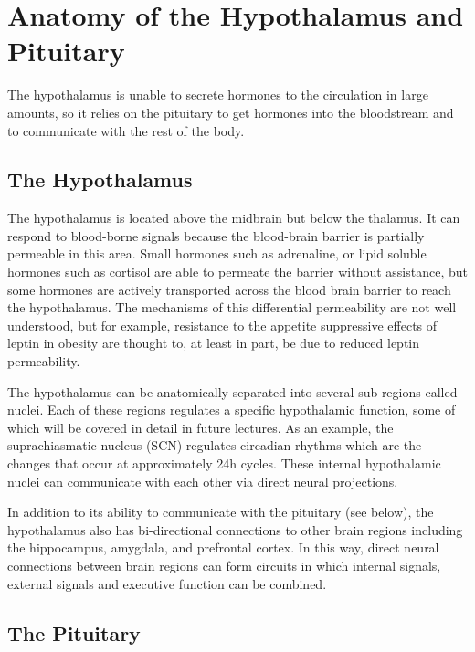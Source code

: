 \documentclass{tufte-handout}
\begin{document}
\pagebreak

\section{Anatomy of the Hypothalamus and Pituitary}
The hypothalamus is unable to secrete hormones to the circulation in large amounts, so it relies on the pituitary to get hormones into the bloodstream and to communicate with the rest of the body.

\subsection{The Hypothalamus}

The hypothalamus is located above the midbrain but below the thalamus.  It can respond to blood-borne signals because the blood-brain barrier is partially permeable in this area.  Small hormones such as adrenaline, or lipid soluble hormones such as cortisol are able to permeate the barrier without assistance, but some hormones are actively transported across the blood brain barrier to reach the hypothalamus\cite{Huber2001}.  The mechanisms of this differential permeability are not well understood, but for example, resistance to the appetite suppressive effects of leptin in obesity are thought to, at least in part, be due to reduced leptin permeability\cite{Burguera2000}. 

  The hypothalamus can be anatomically separated into several sub-regions called nuclei.  Each of these regions regulates a specific hypothalamic function, some of which will be covered in detail in future lectures.  As an example, the suprachiasmatic nucleus (SCN) regulates circadian rhythms which are the changes that occur at approximately 24h cycles.  These internal hypothalamic nuclei can communicate with each other via direct neural projections.

  In addition to its ability to communicate with the pituitary (see below), the hypothalamus also has bi-directional connections to other brain regions including the hippocampus, amygdala, and prefrontal cortex.  In this way, direct neural connections between brain regions can form circuits in which internal signals, external signals and executive function can be combined.

\subsection{The Pituitary}
\end{document}
